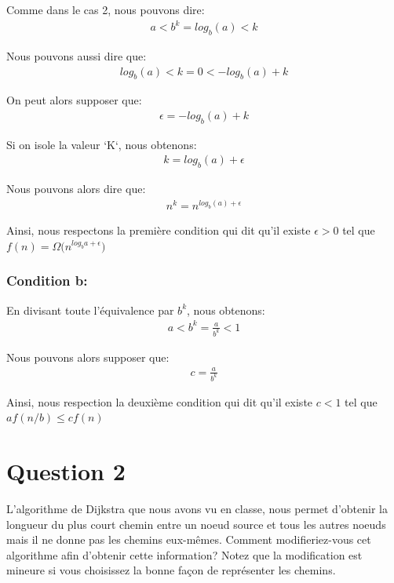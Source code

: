 \documentclass[12pt]{article}
\begin{document}
Comme dans le cas 2, nous pouvons dire:
\begin{align*}
	a < b^k =  log_b(a) <  k
\end{align*}

Nous pouvons aussi dire que:
\begin{align*}
	log_b(a) <  k = 0 < -log_b(a) + k
\end{align*}

On peut alors supposer que:
\begin{align*}
	\epsilon = -log_b(a) + k
\end{align*}

Si on isole la valeur `K`, nous obtenons:
\begin{align*}
	k = log_b(a) + \epsilon
\end{align*}

Nous pouvons alors dire que:
\begin{align*}
	n^k = n ^{log_b(a) + \epsilon}
\end{align*}

Ainsi, nous respectons la première condition qui dit qu'il existe \( \epsilon > 0 \) tel que \( f(n) = \Omega\big(n^{log_ba+\epsilon}  \big) \)


\subsubsection*{Condition b:}
En divisant toute l'équivalence par \(b^k\), nous obtenons:
\begin{align*}
	a < b^k =  \frac{a}{b^k} < 1
\end{align*}

Nous pouvons alors supposer que:
\begin{align*}
	c =  \frac{a}{b^k}
\end{align*}

Ainsi, nous respection  la deuxième condition qui dit qu'il existe  \( c < 1 \) tel que \( af(n/b) \leq cf(n) \)


\newpage

\section*{Question 2}
L’algorithme de Dijkstra que nous avons vu en classe, nous permet
d’obtenir la longueur du plus court chemin entre un noeud source et
tous les autres noeuds mais il ne donne pas les chemins eux-mêmes. Comment modifieriez-vous cet algorithme afin d’obtenir cette information? Notez que la modification est mineure si vous choisissez la bonne façon de représenter les chemins.
\end{document}
